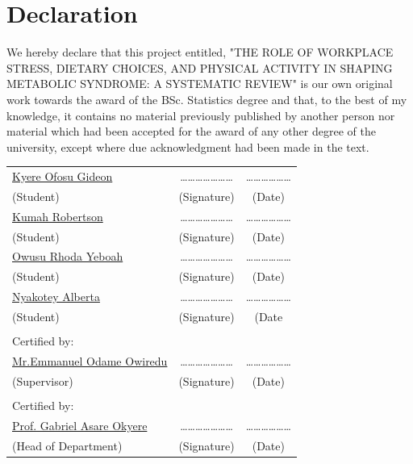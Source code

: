 \chapter*{Declaration}


We hereby declare that this project entitled, "THE ROLE OF WORKPLACE STRESS, DIETARY
CHOICES, AND PHYSICAL ACTIVITY IN SHAPING
METABOLIC SYNDROME: A SYSTEMATIC REVIEW" is our own original work towards the award of
the BSc. Statistics degree and that, to the best of my knowledge, it contains no material previously published by another person nor material which had been accepted for the award of any other degree of the university, except where due acknowledgment had been made in the text.
\newpage

\begin{center}
 \begin{tabular}{lcc}
   \underline{Kyere Ofosu Gideon} &\quad\quad\quad \ldots\ldots\ldots\ldots\ldots\ldots\ldots &\quad\quad\quad \ldots\ldots\ldots\ldots\ldots\ldots \\
 (Student) &\quad\quad\quad (Signature) &\quad\quad\quad (Date)
 
  \\

 \underline{Kumah Robertson} &\quad\quad\quad \ldots\ldots\ldots\ldots\ldots\ldots\ldots &\quad\quad\quad \ldots\ldots\ldots\ldots\ldots\ldots \\
 (Student) &\quad\quad\quad (Signature) &\quad\quad\quad (Date) 
 \\

  \underline{Owusu Rhoda Yeboah } &\quad\quad\quad \ldots\ldots\ldots\ldots\ldots\ldots\ldots &\quad\quad\quad \ldots\ldots\ldots\ldots\ldots\ldots \\
 (Student) &\quad\quad\quad (Signature) &\quad\quad\quad (Date)
 \\
  
   \underline{Nyakotey Alberta } &\quad\quad\quad \ldots\ldots\ldots\ldots\ldots\ldots\ldots &\quad\quad\quad \ldots\ldots\ldots\ldots\ldots\ldots \\
 (Student) &\quad\quad\quad (Signature) &\quad\quad\quad (Date
 
  \\
 & & \\
 
  Certified by: & &\\
 \underline{Mr.Emmanuel Odame Owiredu} &\quad\quad\quad \ldots\ldots\ldots\ldots\ldots\ldots\ldots &\quad\quad\quad \ldots\ldots\ldots\ldots\ldots\ldots \\
 (Supervisor) &\quad\quad\quad (Signature) &\quad\quad\quad (Date) \\
 & & \\
 Certified by: & &\\
 \underline{Prof. Gabriel Asare Okyere } &\quad\quad\quad \ldots\ldots\ldots\ldots\ldots\ldots\ldots &\quad\quad\quad \ldots\ldots\ldots\ldots\ldots\ldots \\
 (Head of Department) &\quad\quad\quad (Signature) &\quad\quad\quad (Date)
\end{tabular}
\end{center}